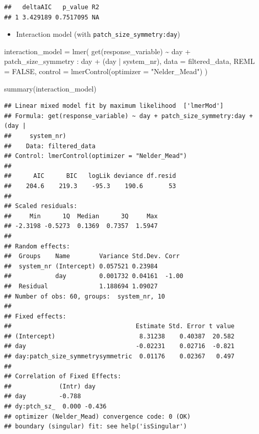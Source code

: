 \documentclass[
]{article}
\newenvironment{Shaded}{\begin{snugshade}}{\end{snugshade}}
\newcommand{\AttributeTok}[1]{\textcolor[rgb]{0.77,0.63,0.00}{#1}}
\newcommand{\ConstantTok}[1]{\textcolor[rgb]{0.00,0.00,0.00}{#1}}
\newcommand{\FunctionTok}[1]{\textcolor[rgb]{0.00,0.00,0.00}{#1}}
\newcommand{\NormalTok}[1]{#1}
\newcommand{\OtherTok}[1]{\textcolor[rgb]{0.56,0.35,0.01}{#1}}
\newcommand{\SpecialCharTok}[1]{\textcolor[rgb]{0.00,0.00,0.00}{#1}}
\newcommand{\StringTok}[1]{\textcolor[rgb]{0.31,0.60,0.02}{#1}}
\providecommand{\tightlist}{%
  \setlength{\itemsep}{0pt}\setlength{\parskip}{0pt}}
\begin{document}
\begin{verbatim}
##   deltaAIC   p_value R2
## 1 3.429189 0.7517095 NA
\end{verbatim}

\begin{itemize}
\tightlist
\item
  Interaction model (with \texttt{patch\_size\_symmetry:day})
\end{itemize}

\begin{Shaded}
\begin{Highlighting}[]
\NormalTok{interaction\_model }\OtherTok{=} \FunctionTok{lmer}\NormalTok{(}
  \FunctionTok{get}\NormalTok{(response\_variable) }\SpecialCharTok{\textasciitilde{}}
\NormalTok{    day }\SpecialCharTok{+} 
\NormalTok{    patch\_size\_symmetry }\SpecialCharTok{:}\NormalTok{ day }\SpecialCharTok{+} 
\NormalTok{    (day }\SpecialCharTok{|}\NormalTok{ system\_nr), }
  \AttributeTok{data =}\NormalTok{ filtered\_data,}
  \AttributeTok{REML =} \ConstantTok{FALSE}\NormalTok{,}
  \AttributeTok{control =} \FunctionTok{lmerControl}\NormalTok{(}\AttributeTok{optimizer =} \StringTok{"Nelder\_Mead"}\NormalTok{)}
\NormalTok{)}

\FunctionTok{summary}\NormalTok{(interaction\_model)}
\end{Highlighting}
\end{Shaded}

\begin{verbatim}
## Linear mixed model fit by maximum likelihood  ['lmerMod']
## Formula: get(response_variable) ~ day + patch_size_symmetry:day + (day |  
##     system_nr)
##    Data: filtered_data
## Control: lmerControl(optimizer = "Nelder_Mead")
## 
##      AIC      BIC   logLik deviance df.resid 
##    204.6    219.3    -95.3    190.6       53 
## 
## Scaled residuals: 
##     Min      1Q  Median      3Q     Max 
## -2.3198 -0.5273  0.1369  0.7357  1.5947 
## 
## Random effects:
##  Groups    Name        Variance Std.Dev. Corr 
##  system_nr (Intercept) 0.057521 0.23984       
##            day         0.001732 0.04161  -1.00
##  Residual              1.188694 1.09027       
## Number of obs: 60, groups:  system_nr, 10
## 
## Fixed effects:
##                                  Estimate Std. Error t value
## (Intercept)                       8.31238    0.40387  20.582
## day                              -0.02231    0.02716  -0.821
## day:patch_size_symmetrysymmetric  0.01176    0.02367   0.497
## 
## Correlation of Fixed Effects:
##             (Intr) day   
## day         -0.788       
## dy:ptch_sz_  0.000 -0.436
## optimizer (Nelder_Mead) convergence code: 0 (OK)
## boundary (singular) fit: see help('isSingular')
\end{verbatim}
\end{document}
